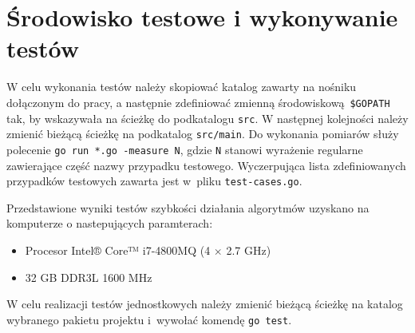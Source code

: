 \section{Środowisko testowe i wykonywanie testów}
\par{
  W celu wykonania testów należy skopiować katalog zawarty na nośniku dołączonym do pracy, a następnie zdefiniować zmienną środowiskową \texttt{\$GOPATH} tak, by wskazywała na ścieżkę do podkatalogu \texttt{src}.
  W następnej kolejności należy zmienić bieżącą ścieżkę na podkatalog \texttt{src/main}.
  Do wykonania pomiarów służy polecenie \texttt{go run *.go -measure N}, gdzie \texttt{N} stanowi wyrażenie regularne zawierające część nazwy przypadku testowego.
  Wyczerpująca lista zdefiniowanych przypadków testowych zawarta jest w~pliku \texttt{test-cases.go}.

  Przedstawione wyniki testów szybkości działania algorytmów uzyskano na komputerze o nastepujących paramterach:
  \begin{itemize}
    \item Procesor Intel® Core™ i7-4800MQ (4 $\times$ 2.7 GHz)
    \item 32 GB DDR3L 1600 MHz
  \end{itemize}


  W celu realizacji testów jednostkowych należy zmienić bieżącą ścieżkę na katalog wybranego pakietu projektu i~wywołać komendę \texttt{go test}.
}
